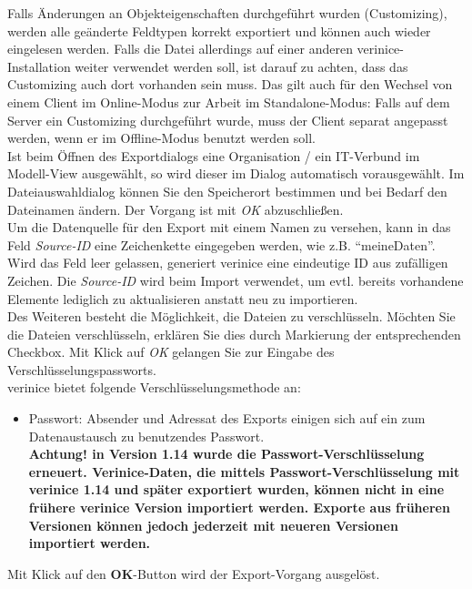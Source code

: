 \documentclass[a4paper,10pt]{book}
\begin{document}
Falls Änderungen an Objekteigenschaften durchgeführt wurden (Customizing), werden alle geänderte Feldtypen korrekt exportiert und können
auch wieder eingelesen werden. Falls die Datei allerdings auf einer anderen verinice-Installation weiter verwendet werden soll, ist darauf
zu achten, dass das Customizing auch dort vorhanden sein muss. Das gilt auch für den Wechsel von einem Client im Online-Modus zur Arbeit
im Standalone-Modus: Falls auf dem Server ein Customizing durchgeführt wurde, muss der Client separat angepasst werden, wenn er im Offline-Modus
benutzt werden soll.
\newline\\
Ist beim Öffnen des Exportdialogs eine Organisation / ein IT-Verbund im Modell-View ausgewählt, so wird dieser im Dialog automatisch vorausgewählt.
Im Dateiauswahldialog können Sie den Speicherort bestimmen und bei Bedarf den Dateinamen ändern. Der Vorgang ist mit  \textit{OK} abzuschließen.
\newline\\
Um die Datenquelle für den Export mit einem Namen zu versehen, kann in das Feld \textit{Source-ID} eine Zeichenkette eingegeben werden, wie z.B.
``meineDaten''. Wird das Feld leer gelassen, generiert verinice eine eindeutige ID aus zufälligen Zeichen. Die \textit{Source-ID} wird beim Import verwendet,
um evtl. bereits vorhandene Elemente lediglich zu aktualisieren anstatt neu zu importieren.
\newline\\
Des Weiteren besteht die Möglichkeit, die Dateien zu verschlüsseln. Möchten Sie die Dateien verschlüsseln, erklären Sie dies durch Markierung der
entsprechenden Checkbox. Mit Klick auf \textit{OK} gelangen Sie zur Eingabe des Verschlüsselungspassworts.
\newline\\
verinice bietet folgende Verschlüsselungsmethode an:
\begin{itemize}
\item Passwort: Absender und Adressat des Exports einigen sich auf ein
  zum
  Datenaustausch zu benutzendes Passwort.\\
  \textbf{Achtung! in Version 1.14 wurde die Passwort-Verschlüsselung
    erneuert.  Verinice-Daten, die mittels Passwort-Verschlüsselung
    mit verinice 1.14 und später exportiert wurden, können nicht in
    eine frühere verinice Version importiert werden. Exporte aus
    früheren Versionen können jedoch jederzeit mit neueren Versionen
    importiert werden.}
\end{itemize}
Mit Klick auf den \textbf{OK}-Button wird der Export-Vorgang ausgelöst.
\end{document}
